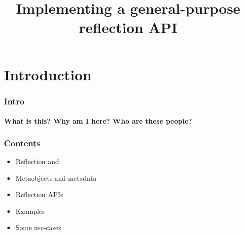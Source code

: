 \documentclass[compress,table,xcolor=table]{beamer}
\begin{document}
\title{Implementing a general-purpose reflection API}
\section{Introduction}
\begin{frame}
  \frametitle{Intro}
  \framesubtitle{What is this? Why am I here? Who are these people?}
\end{frame}
\begin{frame}
  \frametitle{Contents}
  \LARGE
  \begin{itemize}
    \item Reflection \smaller and 
    \item Metaobjects and metadata
    \item Reflection APIs
    \item Examples
    \item Some use-cases
  \end{itemize}
\end{frame}
\end{document}
